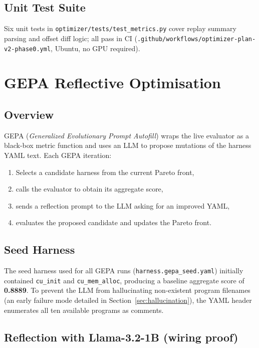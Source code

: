 \documentclass[11pt,a4paper]{article}
\begin{document}
\subsection{Unit Test Suite}

Six unit tests in \texttt{optimizer/tests/test\_metrics.py} cover replay
summary parsing and offset diff logic; all pass in CI
(\texttt{.github/workflows/optimizer-plan-v2-phase0.yml}, Ubuntu,
no GPU required).

\section{GEPA Reflective Optimisation}
\label{sec:gepa}

\subsection{Overview}

GEPA (\textit{Generalized Evolutionary Prompt Autofill}) wraps the live
evaluator as a black-box metric function and uses an LLM to propose mutations
of the harness YAML text.
Each GEPA iteration:
\begin{enumerate}[leftmargin=*]
  \item Selects a candidate harness from the current Pareto front,
  \item calls the evaluator to obtain its aggregate score,
  \item sends a reflection prompt to the LLM asking for an improved YAML,
  \item evaluates the proposed candidate and updates the Pareto front.
\end{enumerate}

\subsection{Seed Harness}

The seed harness used for all GEPA runs (\texttt{harness.gepa\_seed.yaml})
initially contained \texttt{cu\_init} and \texttt{cu\_mem\_alloc},
producing a baseline aggregate score of \textbf{0.8889}.
To prevent the LLM from hallucinating non-existent program filenames
(an early failure mode detailed in Section~\ref{sec:hallucination}), the
YAML header enumerates all ten available programs as comments.

\subsection{Reflection with Llama-3.2-1B (wiring proof)}
\end{document}
